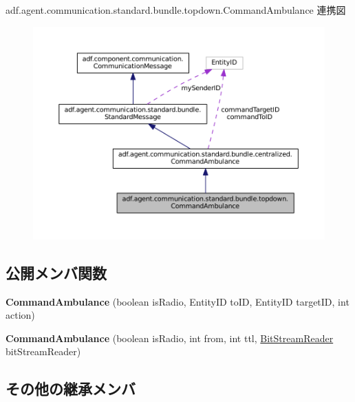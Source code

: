 adf.\+agent.\+communication.\+standard.\+bundle.\+topdown.\+Command\+Ambulance 連携図
\nopagebreak
\begin{figure}[H]
\begin{center}
\leavevmode
\includegraphics[width=350pt]{classadf_1_1agent_1_1communication_1_1standard_1_1bundle_1_1topdown_1_1CommandAmbulance__coll__graph}
\end{center}
\end{figure}
\subsection*{公開メンバ関数}
\begin{DoxyCompactItemize}
\item 
\hypertarget{classadf_1_1agent_1_1communication_1_1standard_1_1bundle_1_1topdown_1_1CommandAmbulance_ad1a27204ff06b816f7ae46e878a5f06d}{}\label{classadf_1_1agent_1_1communication_1_1standard_1_1bundle_1_1topdown_1_1CommandAmbulance_ad1a27204ff06b816f7ae46e878a5f06d} 
{\bfseries Command\+Ambulance} (boolean is\+Radio, Entity\+ID to\+ID, Entity\+ID target\+ID, int action)
\item 
\hypertarget{classadf_1_1agent_1_1communication_1_1standard_1_1bundle_1_1topdown_1_1CommandAmbulance_a2f2920c0847d04bf2436ce93ab97b426}{}\label{classadf_1_1agent_1_1communication_1_1standard_1_1bundle_1_1topdown_1_1CommandAmbulance_a2f2920c0847d04bf2436ce93ab97b426} 
{\bfseries Command\+Ambulance} (boolean is\+Radio, int from, int ttl, \hyperlink{classadf_1_1component_1_1communication_1_1util_1_1BitStreamReader}{Bit\+Stream\+Reader} bit\+Stream\+Reader)
\end{DoxyCompactItemize}
\subsection*{その他の継承メンバ}


